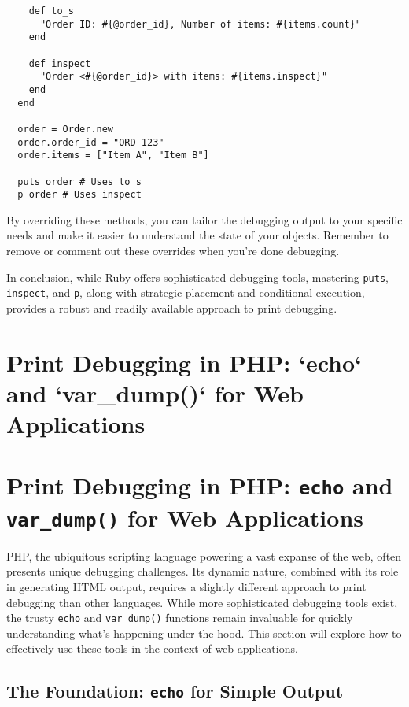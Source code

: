 \documentclass{article}
\begin{document}
{{{{\begin{verbatim}
    def to_s
      "Order ID: #{@order_id}, Number of items: #{items.count}"
    end

    def inspect
      "Order <#{@order_id}> with items: #{items.inspect}"
    end
  end

  order = Order.new
  order.order_id = "ORD-123"
  order.items = ["Item A", "Item B"]

  puts order # Uses to_s
  p order # Uses inspect
\end{verbatim}

By overriding these methods, you can tailor the debugging output to your specific needs and make it easier to understand the state of your objects. Remember to remove or comment out these overrides when you're done debugging.

In conclusion, while Ruby offers sophisticated debugging tools, mastering \texttt{puts}, \texttt{inspect}, and \texttt{p}, along with strategic placement and conditional execution, provides a robust and readily available approach to print debugging.

\newpage

\section*{Print Debugging in PHP: `echo` and `var_dump()` for Web Applications} %
\label{chapter-9-8-Print_Debugging_in_PHP___echo__and__var}

\section*{Print Debugging in PHP: \texttt{echo} and \texttt{var\_dump()} for Web Applications}

PHP, the ubiquitous scripting language powering a vast expanse of the web, often presents unique debugging challenges. Its dynamic nature, combined with its role in generating HTML output, requires a slightly different approach to print debugging than other languages. While more sophisticated debugging tools exist, the trusty \texttt{echo} and \texttt{var\_dump()} functions remain invaluable for quickly understanding what's happening under the hood. This section will explore how to effectively use these tools in the context of web applications.

\subsection*{The Foundation: \texttt{echo} for Simple Output}

}}}}
\end{document}
